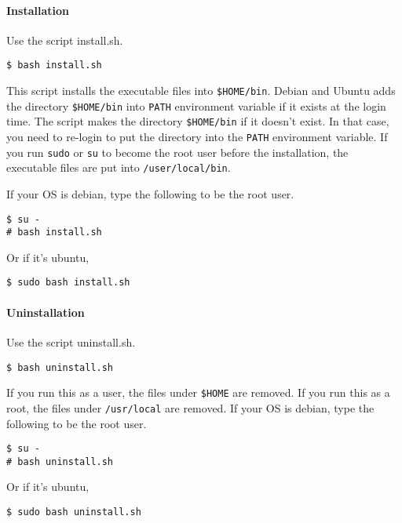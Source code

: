 \hypertarget{installation}{%
\paragraph{Installation}\label{installation}}

Use the script install.sh.

\begin{verbatim}
$ bash install.sh
\end{verbatim}

This script installs the executable files into \texttt{\$HOME/bin}.
Debian and Ubuntu adds the directory \texttt{\$HOME/bin} into
\texttt{PATH} environment variable if it exists at the login time. The
script makes the directory \texttt{\$HOME/bin} if it doesn't exist. In
that case, you need to re-login to put the directory into the
\texttt{PATH} environment variable. If you run \texttt{sudo} or
\texttt{su} to become the root user before the installation, the
executable files are put into \texttt{/user/local/bin}.

If your OS is debian, type the following to be the root user.

\begin{verbatim}
$ su -
# bash install.sh
\end{verbatim}

Or if it's ubuntu,

\begin{verbatim}
$ sudo bash install.sh
\end{verbatim}

\hypertarget{uninstallation}{%
\paragraph{Uninstallation}\label{uninstallation}}

Use the script uninstall.sh.

\begin{verbatim}
$ bash uninstall.sh
\end{verbatim}

If you run this as a user, the files under \texttt{\$HOME} are removed.
If you run this as a root, the files under \texttt{/usr/local} are
removed. If your OS is debian, type the following to be the root user.

\begin{verbatim}
$ su -
# bash uninstall.sh
\end{verbatim}

Or if it's ubuntu,

\begin{verbatim}
$ sudo bash uninstall.sh
\end{verbatim}
